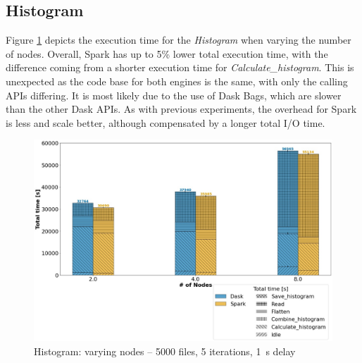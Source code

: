 \documentclass[conference]{IEEEtran}
\begin{document}
\subsection{Histogram}
Figure \ref{fig:histogram_worker} depicts the execution time for the \textit{Histogram} when varying the number of nodes.
Overall, Spark has up to 5\% lower total execution time, with the difference coming from a shorter execution time for \textit{Calculate\_histogram}.
This is unexpected as the code base for both engines is the same, with only the calling APIs differing.
It is most likely due to the use of Dask Bags, which are slower than the other Dask APIs.
As with previous experiments, the overhead for Spark is less and scale better, although compensated by a longer total I/O time.
\begin{figure}[!t]
	\centering
	\includegraphics[clip,width=\columnwidth]{figures/stacked_histogram_worker.jpg}
	\caption{Histogram: varying nodes -- 5000 files, 5 iterations, \SI{1}{\second} delay}
	\label{fig:histogram_worker}
\end{figure}
		
\end{document}
